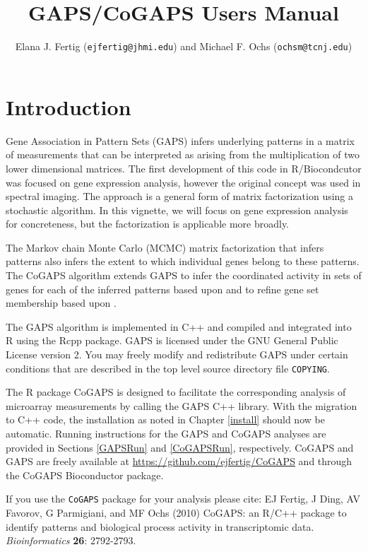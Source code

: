 \documentclass{report}
\author{Elana J. Fertig (\texttt{ejfertig@jhmi.edu}) and Michael F. Ochs (\texttt{ochsm@tcnj.edu})}
\title{GAPS/CoGAPS Users Manual}
\begin{document}


\maketitle
\tableofcontents

\chapter{Introduction}

\par Gene Association in Pattern Sets (GAPS) infers underlying patterns in a matrix of measurements that can be interpreted as arising from the multiplication of two lower dimensional matrices.  The first development of this code in R/Biocondcutor was focused on gene expression analysis, however the original concept was used in spectral imaging.  The approach is a general form of matrix factorization using a stochastic algorithm.  In this vignette, we will focus on gene expression analysis for concreteness, but the factorization is applicable more broadly.

The Markov chain Monte Carlo (MCMC) matrix factorization that infers patterns also infers the extent to which individual genes belong to these patterns.  The CoGAPS algorithm extends GAPS to infer the coordinated activity in sets of genes for each of the inferred patterns based upon \cite{Ochs2009} and to refine gene set membership based upon \cite{Fertig2012}.

\par The GAPS algorithm is implemented in C++ and compiled and integrated into R using the Rcpp package.  GAPS is licensed under the GNU General Public License version 2.  You may freely modify and redistribute GAPS under certain conditions that are described in the top level source directory file \nolinkurl{COPYING}.

\par The R package CoGAPS is designed to facilitate the corresponding analysis of microarray measurements by calling the GAPS C++ library.  With the migration to C++ code, the installation as noted in Chapter \ref{install} should now be automatic.  Running instructions for the GAPS and CoGAPS analyses are provided in Sections \ref{GAPSRun} and \ref{CoGAPSRun}, respectively.  CoGAPS and GAPS are freely available at \url{https://github.com/ejfertig/CoGAPS} and through the CoGAPS Bioconductor package.

\par If you use the \texttt{CoGAPS} package for your analysis please cite:
\cite{Fertig2010} EJ Fertig, J Ding, AV Favorov, G Parmigiani, and MF Ochs (2010) CoGAPS: an R/C++ package to identify patterns and biological process activity in transcriptomic data. \textit{Bioinformatics} \textbf{26}: 2792-2793.
\end{document}

